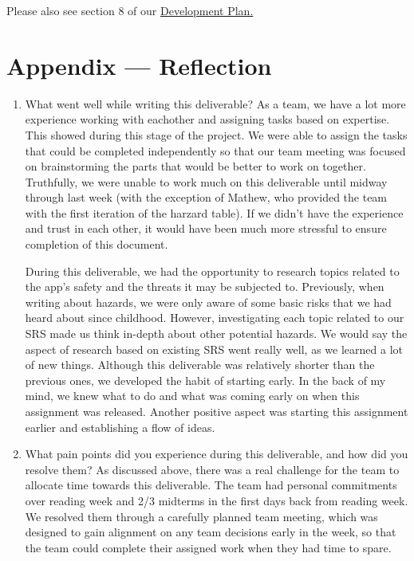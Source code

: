 \documentclass{article}
\begin{document}
      Please also see section 8 of our \href{https://github.com/OKKM-insights/OKKM.insights/blob/main/docs/DevelopmentPlan/DevelopmentPlan.pdf}{Development Plan.}
\newpage{}

\section*{Appendix --- Reflection}



\begin{enumerate}
    \item What went well while writing this deliverable?
    As a team, we have a lot more experience working with eachother and assigning tasks based on expertise. This showed during this stage of the project. We were able to
    assign the tasks that could be completed independently so that our team meeting was focused on brainstorming the parts that would be better to work on together. Truthfully, we 
    were unable to work much on this deliverable until midway through last week (with the exception of Mathew, who provided the team with the first iteration of the harzard table). If we 
    didn't have the experience and trust in each other, it would have been much more stressful to ensure completion of this document.
    
    During this deliverable, we had the opportunity to research topics related to the app’s safety and the threats it may be subjected to. Previously, when writing about hazards, 
    we were only aware of some basic risks that we had heard about since childhood. However, investigating each topic related to our SRS made us think in-depth about other potential hazards. 
    We would say the aspect of research based on existing SRS went really well, as we learned a lot of new things. Although this deliverable was relatively shorter than the previous ones, we developed the habit of starting early. In the back of my mind, we knew what to 
    do and what was coming early on when this assignment was released. Another positive aspect was starting this assignment earlier and establishing a flow of ideas.

    \item What pain points did you experience during this deliverable, and how
    did you resolve them?
    As discussed above, there was a real challenge for the team to allocate time towards this deliverable. The team had personal commitments over reading week
    and 2/3 midterms in the first days back from reading week. We resolved them through a carefully planned team meeting, which was designed to gain alignment on any team decisions
    early in the week, so that the team could complete their assigned work when they had time to spare.


\end{enumerate}
\end{document}
